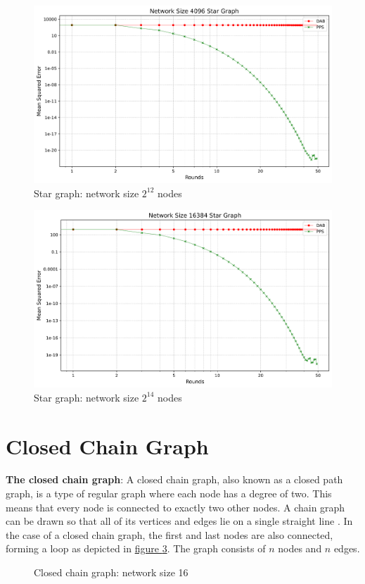 \begin{figure}[H]
    \centering
    \includegraphics[scale=0.5]{figures/starGraphSimulations/DAB_vs_PPS_SG_r50_n4096.png}
    \caption{Star graph: network size $2^{12}$ nodes}
    \label{fig:4096StarGraph}
\end{figure}

\begin{figure}[H]
    \centering
    \includegraphics[scale=0.5]{figures/starGraphSimulations/DAB_vs_PPS_SG_r50_n16384.png}
    \caption{Star graph: network size $2^{14}$ nodes}
    \label{fig:16384StarGraph}
\end{figure}

\section{Closed Chain Graph}
\textbf{The closed chain graph}: A closed chain graph, also known as a closed path graph, is a type of regular graph where each node has a degree of two. This means that every node is connected to exactly two other nodes. A chain graph can be drawn so that all of its vertices and edges lie on a single straight line \cite{gross1998graph}. In the case of a closed chain graph, the first and last nodes are also connected, forming a loop as depicted in \hyperref[fig:closedChainGraphDemo]{figure } \ref{fig:closedChainGraphDemo}. The graph consists of $n$ nodes and $n$ edges.
\begin{figure}[H]
    \centering
    \scalebox{0.8}{}
    \caption{Closed chain graph: network size 16}
    \label{fig:closedChainGraphDemo}
\end{figure}
